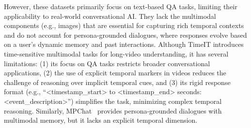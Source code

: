 However, these datasets primarily focus on text-based QA tasks, limiting their applicability to real-world conversational AI. They lack the multimodal components (e.g., images) that are essential for capturing rich temporal contexts and do not account for persona-grounded dialogues, where responses evolve based on a user's dynamic memory and past interactions. Although TimeIT \cite{ren2023timechat} introduces time-sensitive multimodal tasks for long-video understanding, it has several limitations: (1) its focus on QA tasks restricts broader conversational applications, (2) the use of explicit temporal markers in videos reduces the challenge of reasoning over implicit temporal cues, and (3) its rigid response format  (e.g., ``<timestamp\_start> to <timestamp\_end> seconds: <event\_description>'') simplifies the task, minimizing complex temporal reasoning. Similarly, MPChat~\cite{ahn2023mpchat} provides persona-grounded dialogues with multimodal memory, but it lacks an explicit temporal dimension.


